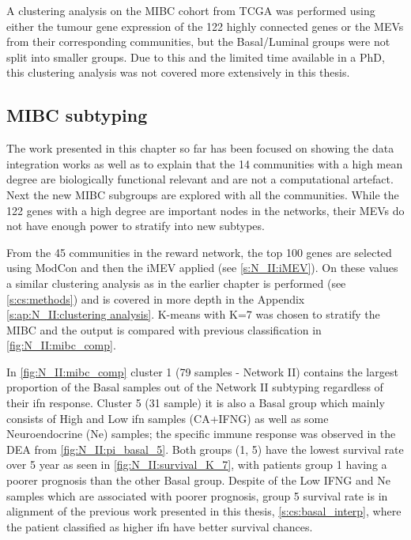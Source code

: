 A clustering analysis on the MIBC cohort from TCGA was performed using either the tumour gene expression of the 122 highly connected genes or the MEVs from their corresponding communities, but the Basal/Luminal groups were not split into smaller groups. Due to this and the limited time available in a PhD, this clustering analysis was not covered more extensively in this thesis.



\subsection{MIBC subtyping}

The work presented in this chapter so far has been focused on showing the data integration works as well as to explain that the 14 communities with a high mean degree are biologically functional relevant and are not a computational artefact. Next the new MIBC subgroups are explored with all the communities. While the 122 genes with a high degree are important nodes in the networks, their MEVs do not have enough power to stratify into new subtypes.

From the 45 communities in the reward network, the top 100 genes are selected using ModCon and then the iMEV applied (see \cref{s:N_II:iMEV}). On these values a similar clustering analysis as in the earlier chapter is performed (see \cref{s:cs:methods}) and is covered in more depth in the Appendix 
\cref{s:ap:N_II:clustering analysis}. K-means with K=7 was chosen to stratify the MIBC and the output is compared with previous classification in \cref{fig:N_II:mibc_comp}.


In \cref{fig:N_II:mibc_comp} cluster 1 (79 samples - Network II) contains the largest proportion of the Basal samples out of the Network II subtyping regardless of their \acrfull{ifn} response. Cluster 5 (31 sample) it is also a Basal group which mainly consists of High and Low \acrshort{ifn} samples (CA+IFNG) as well as some Neuroendocrine (Ne) samples; the specific immune response was observed in the DEA from \cref{fig:N_II:pi_basal_5}. Both groups (1, 5) have the lowest survival rate over 5 year as seen in \cref{fig:N_II:survival_K_7}, with patients group 1 having a poorer prognosis than the other Basal group. Despite of the Low IFNG and Ne samples which are associated with poorer prognosis, group 5 survival rate is in alignment of the previous work presented in this thesis, \cref{s:cs:basal_interp}, where the patient classified as higher \acrshort{ifn} have better survival chances.

